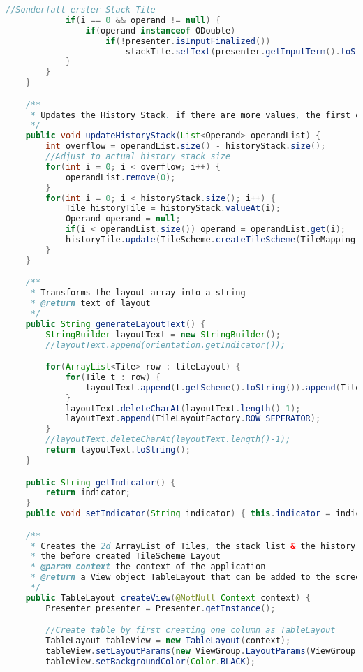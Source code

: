 \begin{lstlisting}[caption=TileLayout,label=list:TileLayout,language=Java]
            //Sonderfall erster Stack Tile
            if(i == 0 && operand != null) {
                if(operand instanceof ODouble)
                    if(!presenter.isInputFinalized())
                        stackTile.setText(presenter.getInputTerm().toString());
            }
        }
    }

    /**
     * Updates the History Stack. if there are more values, the first ones are cut
     */
    public void updateHistoryStack(List<Operand> operandList) {
        int overflow = operandList.size() - historyStack.size();
        //Adjust to actual history stack size
        for(int i = 0; i < overflow; i++) {
            operandList.remove(0);
        }
        for(int i = 0; i < historyStack.size(); i++) {
            Tile historyTile = historyStack.valueAt(i);
            Operand operand = null;
            if(i < operandList.size()) operand = operandList.get(i);
            historyTile.update(TileScheme.createTileScheme(TileMapping.H_HISTORY, operand, i));
        }
    }

    /**
     * Transforms the layout array into a string
     * @return text of layout
     */
    public String generateLayoutText() {
        StringBuilder layoutText = new StringBuilder();
        //layoutText.append(orientation.getIndicator());

        for(ArrayList<Tile> row : tileLayout) {
            for(Tile t : row) {
                layoutText.append(t.getScheme().toString()).append(TileLayoutFactory.COLUMN_SEPERATOR);
            }
            layoutText.deleteCharAt(layoutText.length()-1);
            layoutText.append(TileLayoutFactory.ROW_SEPERATOR);
        }
        //layoutText.deleteCharAt(layoutText.length()-1);
        return layoutText.toString();
    }

    public String getIndicator() {
        return indicator;
    }
    public void setIndicator(String indicator) { this.indicator = indicator; }

    /**
     * Creates the 2d ArrayList of Tiles, the stack list & the history stack list based on
     * the before created TileScheme Layout
     * @param context the context of the application
     * @return a View object TableLayout that can be added to the screen
     */
    public TableLayout createView(@NotNull Context context) {
        Presenter presenter = Presenter.getInstance();

        //Create table by first creating one column as TableLayout
        TableLayout tableView = new TableLayout(context);
        tableView.setLayoutParams(new ViewGroup.LayoutParams(ViewGroup.LayoutParams.MATCH_PARENT, ViewGroup.LayoutParams.MATCH_PARENT));
        tableView.setBackgroundColor(Color.BLACK);


\end{lstlisting}
